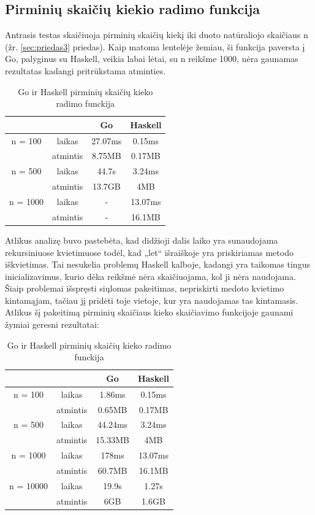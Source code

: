 \documentclass{VUMIFPSkursinis}
\begin{document}
	\subsection{Pirminių skaičių kiekio radimo funkcija}
	 Antrasis testas skaičiuoja pirminių skaičių kiekį iki duoto natūraliojo skaičiaus n (žr. \ref{sec:priedas3} priedas). Kaip matoma lentelėje žemiau, ši funkcija paversta į Go, palyginus su Haskell, veikia labai lėtai, su n reikšme 1000, nėra gaunamas rezultatas kadangi pritrūkstama atminties.
	\begin{center}
		\centering
		\begin{table}[H]
			\caption{Go ir Haskell pirminių skaičių kieko radimo funckija}
			\centering
		\begin{tabular}{ cccc } 
		& & \textbf{Go} & \textbf{Haskell}  \\
		\midrule
		n = 100 & laikas & 27.07ms & 0.15ms    \\
		& atmintis & 8.75MB & 0.17MB \\
		\midrule
		n = 500 & laikas & 44.7s & 3.24ms  \\
		& atmintis & 13.7GB & 4MB \\
		\midrule
		n = 1000 & laikas & - & 13.07ms  \\
		& atmintis & - & 16.1MB \\
		\end{tabular}
		\centering
	\end{table}
		\end{center}
		Atlikus analizę buvo pastebėta, kad didžioji dalis laiko yra sunaudojama rekursiniuose kvietimuose todėl, kad „let“ išraiškoje yra priskiriamas metodo iškvietimas. Tai nesukelia problemų Haskell kalboje, kadangi  yra taikomas tingus inicializavimus, kurio dėka reikšmė nėra skaičiuojama, kol ji nėra naudojama. Šiaip problemai išspręsti siųlomas pakeitimas, nepriskirti medoto kvietimo kintamąjam, tačiau jį pridėti toje vietoje, kur yra naudojamas tas kintamasis. Atlikus šį pakeitimą pirminių skaičiaus kieko skaičiavimo funkcijoje gaunami žymiai geresni rezultatai:
		\begin{center}
			\centering
			\begin{table}[H]
				\caption{Go ir Haskell pirminių skaičių kieko radimo funckija}
				\centering
			\begin{tabular}{ cccc } 
			& & \textbf{Go} & \textbf{Haskell}  \\
			\midrule
			n = 100 & laikas & 1.86ms & 0.15ms    \\
			& atmintis & 0.65MB & 0.17MB \\
			\midrule
			n = 500 & laikas & 44.24ms & 3.24ms  \\
			& atmintis & 15.33MB & 4MB \\
			\midrule
			n = 1000 & laikas & 178ms & 13.07ms  \\
			& atmintis & 60.7MB & 16.1MB \\
			\midrule
			n = 10000 & laikas & 19.9s & 1.27s  \\
			& atmintis & 6GB & 1.6GB \\
			\end{tabular}
			\centering
		\end{table}
			\end{center}
\end{document}
